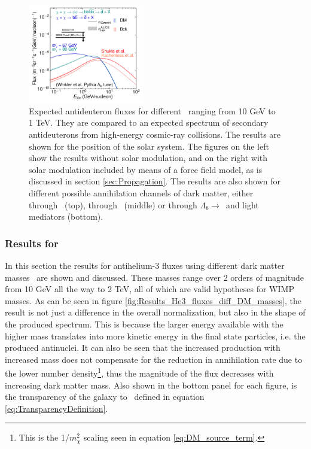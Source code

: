\begin{figure}[hbtp]
    \includegraphics[width=0.45\textwidth]{figures/blambdadbarPaperTOA.pdf}
    \caption{Expected antideuteron fluxes for different \dmm\ ranging from 10 GeV to 1 TeV. They are compared to an expected spectrum of secondary antideuterons from high-energy cosmic-ray collisions. The results are shown for the position of the solar system. The figures on the left show the results without solar modulation, and on the right with solar modulation included by means of a force field model, as is discussed in section \ref{sec:Propagation}. The results are also shown for different possible annihilation channels of dark matter, either through \WW\ (top), through \bb\ (middle) or through $\Lambda_b \rightarrow $\bb\ and light mediators (bottom).}
    \label{fig:Results_dbar_fluxes_diff_DM_masses}
\end{figure}

\subsubsection{Results for \ahe\ }
In this section the results for antihelium-3 fluxes using different dark matter masses \dmm\ are shown and discussed. These masses range over 2 orders of magnitude from 10 GeV all the way to 2 TeV, all of which are valid hypotheses for WIMP masses. As can be seen in figure \ref{fig:Results_He3_fluxes_diff_DM_masses}, the result is not just a difference in the overall normalization, but also in the shape of the produced spectrum. This is because the larger energy available with the higher mass translates into more kinetic energy in the final state particles, i.e. the produced antinuclei. It can also be seen that the increased production with increased mass does not compensate for the reduction in annihilation rate due to the lower number density\footnote{This is the 1/$m_\chi^2$ scaling seen in equation \ref{eq:DM_source_term}.}, thus the magnitude of the flux decreases with increasing dark matter mass. Also shown in the bottom panel for each figure, is the transparency of the galaxy to \ahe\, defined in equation \ref{eq:TransparencyDefinition}. 

